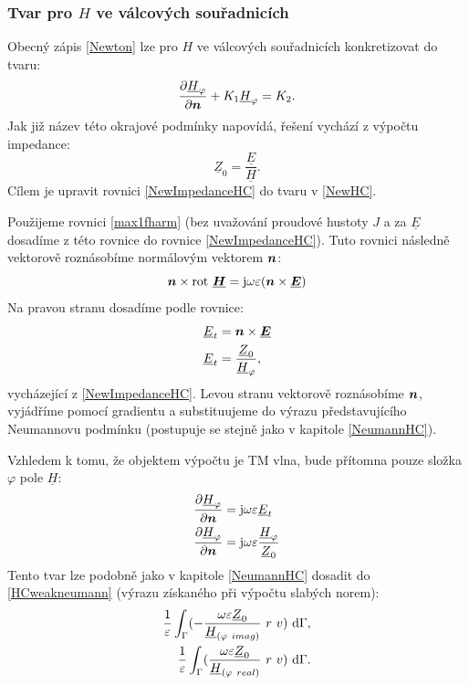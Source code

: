 \documentclass[12pt,a4paper,oneside]{article}
\numberwithin{equation}{section} %
\numberwithin{figure}{section} %
\numberwithin{table}{section} %
\newcommand{\mj}{\mathrm{j}} %
\renewcommand{\vec}[1]{\mbox{\boldmath$#1$}} %
\newcommand{\faz}[1]{{\underline{#1}}} %
\newcommand{\rot}{\mathrm{rot}\ }
\begin{document}
\subsubsection*{Tvar pro \faz{\vec{H}} ve válcových souřadnicích}
Obecný zápis \ref{Newton} lze pro \faz{\vec{H}} ve válcových souřadnicích konkretizovat do tvaru:
\begin{equation}
\label{NewHC}
\frac{\partial \faz{H} _{\varphi}}{\partial \vec{n}} + K_1 \faz{H} _{\varphi} = K_2 .
\end{equation}
Jak již název této okrajové podmínky napovídá, řešení vychází z výpočtu impedance: 
\begin{equation}
\label{NewImpedanceHC}
\faz{Z} _0 = \frac{\faz{E}}{\faz{H}} .
\end{equation}
Cílem je upravit rovnici \ref{NewImpedanceHC} do tvaru v \ref{NewHC}.

Použijeme rovnici \ref{max1fharm} (bez uvažování proudové hustoty $J$ a za $\faz{E}$ dosadíme z této rovnice do rovnice \ref{NewImpedanceHC}). Tuto rovnici následně vektorově roznásobíme normálovým vektorem $\vec{n}$:
\begin{equation}
\vec{n} \times \rot \faz{\vec{H}} = \mj \omega \varepsilon (\vec{n} \times \faz{\vec{E}})
\end{equation}
Na pravou stranu dosadíme podle rovnice:
\begin{subequations}
\begin{align}
\faz{E} _t &= \vec{n} \times \faz{\vec{E}}
\\
\faz{E} _t &= \frac{\faz{Z} _0}{\faz{H} _{\varphi}} ,
\end{align}
\end{subequations}
vycházející z \ref{NewImpedanceHC}. Levou stranu vektorově roznásobíme $\vec{n}$, vyjádříme pomocí gradientu a substituujeme do výrazu představujícího Neumannovu podmínku (postupuje se stejně jako v kapitole \ref{NeumannHC}).

Vzhledem k tomu, že objektem výpočtu je TM vlna, bude přítomna pouze složka $\varphi$ pole $\faz{H}$:
\begin{subequations}
\begin{align}
\frac{\partial \faz{H} _{\varphi}}{\partial \vec{n}} &= \mj \omega \varepsilon \faz{E} _t
\\
\frac{\partial \faz{H} _{\varphi}}{\partial \vec{n}} &= \mj \omega \varepsilon \frac{\faz{H} _{\varphi}}{\faz{Z} _0}
\end{align}
\end{subequations}
Tento tvar lze podobně jako v kapitole \ref{NeumannHC} dosadit do \ref{HCweakneumann} (výrazu získaného při výpočtu slabých norem):
\begin{subequations}
\begin{align}
\frac{1}{\varepsilon} \int _{\Gamma} ( - \frac{\omega \varepsilon \faz{Z} _0}{\faz{H} _{(\varphi ~ imag)}} ~ r ~ v ) ~ \ud \Gamma ,
\\ 
\frac{1}{\varepsilon} \int _{\Gamma} ( \frac{\omega \varepsilon \faz{Z} _0}{\faz{H} _{(\varphi ~ real)}} ~ r ~ v ) ~ \ud \Gamma .
\end{align}
\end{subequations}
\end{document}
